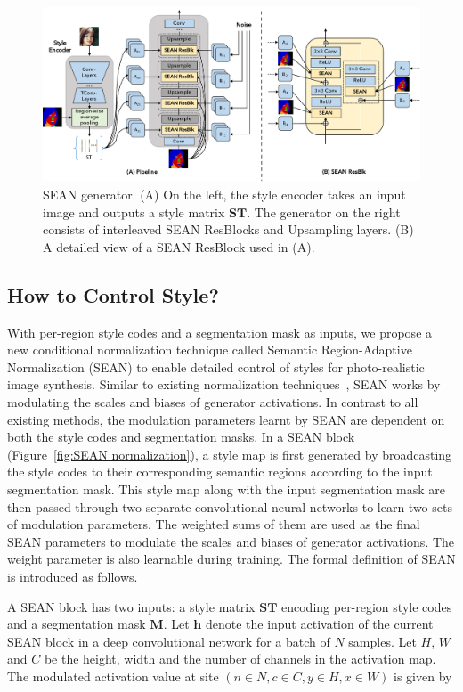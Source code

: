 \documentclass[10pt,twocolumn,letterpaper]{article}
\begin{document}
\begin{figure}[t]
\centering
\includegraphics[width=\linewidth]{Figures/Pipeline_SEANResBlk.pdf}
\caption{SEAN generator. (A) On the left, the style encoder takes an input image and outputs a style matrix $\mathbf{ST}$. The generator on the right consists of interleaved SEAN ResBlocks and Upsampling layers. (B) A detailed view of a SEAN ResBlock used in (A).}
\label{fig:generator}
\end{figure}



\subsection{How to Control Style?}

With per-region style codes and a segmentation mask as inputs, we propose a new conditional normalization technique called Semantic Region-Adaptive Normalization (SEAN) to enable detailed control of styles for photo-realistic image synthesis.
Similar to existing normalization techniques~\cite{Adain2017,park2019SPADE}, SEAN works by modulating the scales and biases of generator activations.
In contrast to all existing methods, the modulation parameters learnt by SEAN are dependent on both the style codes and segmentation masks.
In a SEAN block (Figure~\ref{fig:SEAN normalization}), a style map is first generated by broadcasting the style codes to their corresponding semantic regions according to the input segmentation mask. 
This style map along with the input segmentation mask are then passed through two separate convolutional neural networks to learn two sets of modulation parameters.
The weighted sums of them are used as the final SEAN parameters to modulate the scales and biases of generator activations.
The weight parameter is also learnable during training.
The formal definition of SEAN is introduced as follows.


\vspace*{2mm}
A SEAN block has two inputs: a style matrix $\mathbf{ST}$ encoding per-region style codes and a segmentation mask $\mathbf{M}$. 
Let $\mathbf{h}$ denote the input activation of the current SEAN block in a deep convolutional network for a batch of $N$ samples. Let $H$, $W$ and $C$ be the height, width and the number of channels in the activation map.
The modulated activation value at site $\left(n \in N, c \in C, y \in H, x \in W\right)$ is given by
\end{document}
